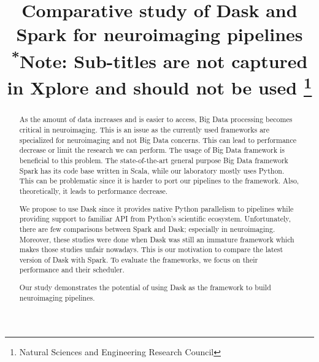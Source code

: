 \documentclass[conference]{IEEEtran}
\begin{document}
\title{Comparative study of Dask and Spark for neuroimaging pipelines\\
{\footnotesize \textsuperscript{*}Note: Sub-titles are not captured in Xplore and
should not be used}
\thanks{Natural Sciences and Engineering Research Council}
}

\author{
\and
{}
\and
{}
}

\maketitle

\begin{abstract}
As the amount of data increases and is easier to access, Big Data processing becomes
critical in neuroimaging.
This is an issue as the currently used frameworks are specialized for neuroimaging
and not Big Data concerns. This can lead to performance decrease or limit the
research we can perform.
The usage of Big Data framework is beneficial to this problem. The state-of-the-art
general purpose Big Data framework Spark has its code base written in Scala, while
our laboratory mostly uses Python. This can be problematic since it is harder to port
our pipelines to the framework. Also, theoretically, it leads to performance decrease.

We propose to use Dask since it provides native Python parallelism to pipelines while
providing support to familiar API from Python's scientific ecosystem. Unfortunately,
there are few comparisons between Spark and Dask; especially in neuroimaging.
Moreover, these studies were done when Dask was still an immature framework which
makes those studies unfair nowadays. This is our motivation to compare the latest
version of Dask with Spark.
To evaluate the frameworks, we focus on their performance and their scheduler.

Our study demonstrates the potential of using Dask as the framework to build
neuroimaging pipelines.
\end{abstract}
\end{document}
